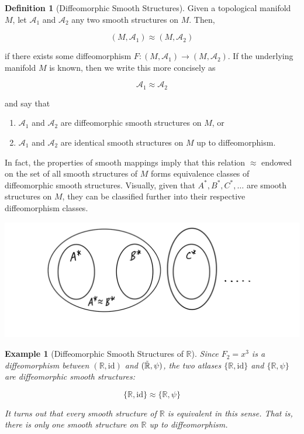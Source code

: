 \documentclass{article}
\newtheorem{example}{Example}[section]
\theoremstyle{remark}
\theoremstyle{definition}
\newtheorem{definition}{Definition}[section]
\begin{document}
      \begin{definition}[Diffeomorphic Smooth Structures]
        Given a topological manifold $M$, let $\mathcal{A}_1$ and $\mathcal{A}_2$ any two smooth structures on $M$. Then, 

          \[(M, \mathcal{A}_1) \approx (M, \mathcal{A}_2)\]

        if there exists some diffeomorphism $F: (M, \mathcal{A}_1) \longrightarrow (M, \mathcal{A}_2)$. If the underlying manifold $M$ is known, then we write this more concisely as

          \[\mathcal{A}_1 \approx \mathcal{A}_2\]

        and say that

        \begin{enumerate}
          \item $\mathcal{A}_1$ and $\mathcal{A}_2$ are diffeomorphic smooth structures on $M$, or
          \item $\mathcal{A}_1$ and $\mathcal{A}_2$ are identical smooth structures on $M$ up to diffeomorphism.
        \end{enumerate}

        In fact, the properties of smooth mappings imply that this relation $\approx$ endowed on the set of all smooth structures of $M$ forms equivalence classes of diffeomorphic smooth structures. Visually, given that $A^*, B^*, C^*, \ldots$ are smooth structures on $M$, they can be classified further into their respective diffeomorphism classes. 

        \begin{center}
          \includegraphics[scale=0.25]{img/Diffeomorphism_Classes.PNG}
        \end{center}
      \end{definition}

      \begin{example}[Diffeomorphic Smooth Structures of $\mathbb{R}$]
        Since $F_2 = x^3$ is a diffeomorphism between $(\mathbb{R}, \text{id})$ and $(\Tilde{\mathbb{R}}, \psi)$, the two atlases $\{\mathbb{R}, \text{id}\}$ and $\{\mathbb{R}, \psi\}$ are diffeomorphic smooth structures: 

          \[\{\mathbb{R}, \text{id}\} \approx \{\mathbb{R}, \psi\}\]

        It turns out that every smooth structure of $\mathbb{R}$ is equivalent in this sense. That is, there is only one smooth structure on $\mathbb{R}$ up to diffeomorphism. 
      \end{example}
\end{document}

